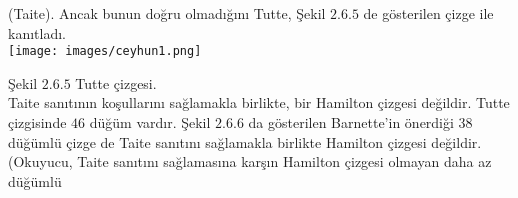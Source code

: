 \documentclass[11pt]{amsbook}
\begin{document}

(Taite). Ancak bunun doğru olmadığını Tutte, Şekil $2.6.5$ de gösterilen çizge ile kanıtladı.\\

\texttt{[image: images/ceyhun1.png]}

Şekil $2.6.5$ Tutte çizgesi.\\

Taite sanıtının koşullarını sağlamakla birlikte, bir Hamilton çizgesi değildir. Tutte çizgisinde $46$ düğüm vardır. Şekil $2.6.6$ da gösterilen Barnette'in önerdiği $38$ düğümlü çizge de Taite sanıtını sağlamakla birlikte Hamilton çizgesi değildir. (Okuyucu, Taite sanıtını sağlamasına karşın Hamilton çizgesi olmayan daha az düğümlü
\end{document}
